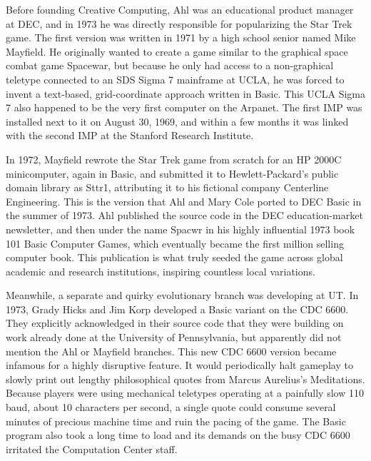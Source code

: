 Before founding Creative Computing, Ahl was an educational product manager at DEC, and in 1973 he was directly responsible for popularizing the Star Trek game. The first version was written in 1971 by a high school senior named Mike Mayfield. He originally wanted to create a game similar to the graphical space combat game Spacewar, but because he only had access to a non-graphical teletype connected to an SDS Sigma 7 mainframe at UCLA, he was forced to invent a text-based, grid-coordinate approach written in Basic. This UCLA Sigma 7 also happened to be the very first computer on the Arpanet. The first IMP was installed next to it on August 30, 1969, and within a few months it was linked with the second IMP at the Stanford Research Institute.

In 1972, Mayfield rewrote the Star Trek game from scratch for an HP 2000C minicomputer, again in Basic, and submitted it to Hewlett-Packard's public domain library as Sttr1, attributing it to his fictional company Centerline Engineering. This is the version that Ahl and Mary Cole ported to DEC Basic in the summer of 1973. Ahl published the source code in the DEC education-market newsletter, and then under the name Spacwr in his highly influential 1973 book 101 Basic Computer Games, which eventually became the first million selling computer book. This publication is what truly seeded the game across global academic and research institutions, inspiring countless local variations.

Meanwhile, a separate and quirky evolutionary branch was developing at UT. In 1973, Grady Hicks and Jim Korp developed a Basic variant on the CDC 6600. They explicitly acknowledged in their source code that they were building on work already done at the University of Pennsylvania, but apparently did not mention the Ahl or Mayfield branches. This new CDC 6600 version became infamous for a highly disruptive feature. It would periodically halt gameplay to slowly print out lengthy philosophical quotes from Marcus Aurelius's Meditations. Because players were using mechanical teletypes operating at a painfully slow 110 baud, about 10 characters per second, a single quote could consume several minutes of precious machine time and ruin the pacing of the game. The Basic program also took a long time to load and its demands on the busy CDC 6600 irritated the Computation Center staff.

